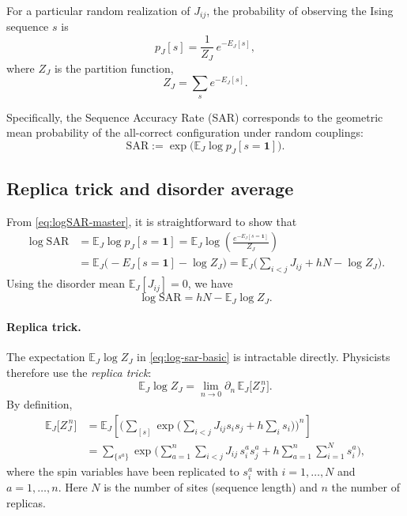 \documentclass{article}
\theoremstyle{plain}
\begin{document}
For a particular random realization of \(J_{ij}\), the probability of observing the Ising sequence \(s\) is
\begin{equation}
p_J[s] = \frac{1}{Z_J} \, e^{-E_J[s]},
\end{equation}
where \(Z_J\) is the partition function,
\begin{equation}
Z_J = \sum_{s} e^{-E_J[s]}.
\end{equation}

Specifically, the Sequence Accuracy Rate (SAR) corresponds to the geometric mean probability of the all-correct configuration under random couplings:
\begin{equation}\label{eq:logSAR-master}
\mathrm{SAR} := \exp\!\big(\mathbb{E}_J \log p_J[s=\mathbf{1}]\big).
\end{equation}

\subsection{Replica trick and disorder average}\label{app:replica}

From \cref{eq:logSAR-master}, it is straightforward to show that
\begin{align}
\log \mathrm{SAR}
&= \mathbb{E}_J \log p_J[s=\mathbf{1}]
= \mathbb{E}_J \log\!\left(\frac{e^{-E_J[s=\mathbf{1}]}}{Z_J}\right) \nonumber\\
&= \mathbb{E}_J \big(-E_J[s=\mathbf{1}] - \log Z_J\big)
= \mathbb{E}_J\!\Big(\sum_{i<j} J_{ij} + hN - \log Z_J\Big).
\end{align}
Using the disorder mean \(\mathbb{E}_J[J_{ij}] = 0\), we have
\begin{equation}
\label{eq:log-sar-basic}
\log \mathrm{SAR}
= hN - \mathbb{E}_J \log Z_J .
\end{equation}

\paragraph{Replica trick.}
The expectation \(\mathbb{E}_J \log Z_J\) in \eqref{eq:log-sar-basic} is intractable directly.
Physicists therefore use the \emph{replica trick}:
\begin{equation}
\label{eq:replica-identity}
\mathbb{E}_J \log Z_J
= \lim_{n\to 0} \partial_n \, \mathbb{E}_J \big[ Z_J^{\,n} \big].
\end{equation}
By definition,
\begin{align}
\mathbb{E}_J \big[ Z_J^{\,n} \big]
&= \mathbb{E}_J \left[
\Big(\sum_{[s]} \exp\big(\sum_{i<j} J_{ij} s_i s_j + h \sum_i s_i\big)\Big)^{\!n}
\right] \nonumber\\
&= \sum_{\{s^a\}} \exp\!\Bigg(
\sum_{a=1}^n \sum_{i<j} J_{ij}\, s_i^a s_j^a
+ h \sum_{a=1}^{n} \sum_{i=1}^{N} s_i^a
\Bigg),
\end{align}
where the spin variables have been replicated to \(s_i^a\) with \(i=1,\ldots,N\) and \(a=1,\ldots,n\).
Here \(N\) is the number of sites (sequence length) and \(n\) the number of replicas.
\end{document}
